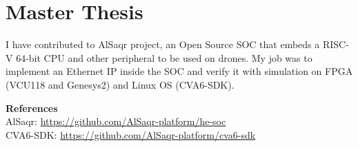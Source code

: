 \section{Master Thesis}

I have contributed to AlSaqr project, an Open Source SOC that embeds a RISC-V
64-bit CPU and other peripheral to be used on drones. My job was to implement
an Ethernet IP inside the SOC and verify it with simulation on FPGA (VCU118 and
Genesys2) and Linux OS (CVA6-SDK). 

\vspace{2mm}
\textbf{References} \\
AlSaqr: \url{https://github.com/AlSaqr-platform/he-soc} \\
CVA6-SDK: \url{https://github.com/AlSaqr-platform/cva6-sdk}
